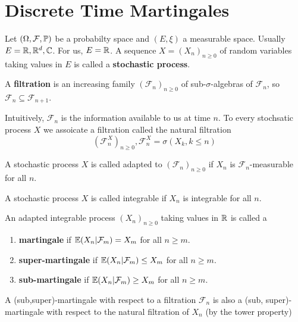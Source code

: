 
\chapter{Discrete Time Martingales}
\label{cha:discr-time-mart}

Let $(\Omega, \mathcal{F}, \Prob)$ be a probabilty space and $(E,
\xi)$ a measurable space.  Usually $E = \mathbb{R}, \mathbb{R}^{d}, \mathbb{C}$.  For
us, $E = \mathbb{R}$.  A sequence $X = (X_{n})_{n \geq 0}$ of random variables
taking values in $E$ is called a \textbf{stochastic process}.

A \textbf{filtration} is an increasing family $(\mathcal{F}_{n})_{n
  \geq 0}$ of sub-$\sigma$-algebras of $\mathcal{F}_{n}$, so
$\mathcal{F}_{n} \subseteq \mathcal{F}_{n+1}$.

Intuitively, $\mathcal{F}_{n}$ is the information available to us at
time $n$.  To every stochsatic process $X$ we assoicate a filtration
called the natural filtration
\begin{equation}
  \label{eq:24}
  (\mathcal{F}^{X}_{n})_{n \geq 0}, \mathcal{F}_{n}^{X} =
  \sigma(X_{k}, k \leq n)
\end{equation}

A stochastic process $X$ is called adapted to $(\mathcal{F}_{n})_{n
  \geq 0}$ if $X_{n}$ is $\mathcal{F}_{n}$-measurable for all $n$.

A stochastic process $X$ is called integrable if $X_{n}$ is integrable
for all $n$.

\begin{defn}
  \label{defn:discrete_time_martingales:1}
  An adapted integrable process $(X_{n})_{n \geq 0}$ taking values in
  $\mathbb{R}$ is called a
  \begin{enumerate}
  \item \textbf{martingale} if $\E{X_{n} | \mathcal{F}_{m}} = X_{m}$
    for all $n \geq m$.
  \item \textbf{super-martingale} if $\E{X_{n} | \mathcal{F}_{m}} \leq
    X_{m}$ for all $n \geq m$.
  \item \textbf{sub-martingale} if $\E{X_{n} | \mathcal{F}_{m}} \geq
    X_{m}$ for all $n \geq m$.
  \end{enumerate}
\end{defn}

\begin{remark}
  A (sub,super)-martingale with respect to a filtration
  $\mathcal{F}_{n}$ is also a (sub, super)-martingale with respect to
  the natural filtration of $X_{n}$ (by the tower property)
\end{remark}


